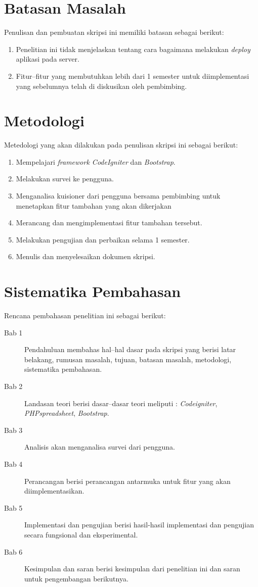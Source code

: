 \section{Batasan Masalah}
\label{sec:batasan}
Penulisan dan pembuatan skripsi ini memiliki batasan sebagai berikut:
\begin{enumerate}
	\item Penelitian ini tidak menjelaskan tentang cara bagaimana melakukan \textit{deploy} aplikasi pada server.
	\item Fitur--fitur yang membutuhkan lebih dari 1 semester untuk diimplementasi yang sebelumnya telah di diskusikan oleh pembimbing.
	
\end{enumerate}


\section{Metodologi}
\label{sec:metlit}
Metedologi yang akan dilakukan pada penulisan skripsi ini sebagai berikut:

\begin{enumerate}
	\item Mempelajari \textit{framework CodeIgniter} dan \textit{Bootstrap}.
	\item Melakukan survei ke pengguna.
	\item Menganalisa kuisioner dari pengguna bersama pembimbing untuk menetapkan fitur tambahan yang akan dikerjakan
	\item Merancang dan mengimplementasi fitur tambahan tersebut.
	\item Melakukan pengujian dan perbaikan selama 1 semester.
	\item Menulis dan menyelesaikan dokumen skripsi.
\end{enumerate}

\section{Sistematika Pembahasan}
\label{sec:sispem}
Rencana pembahasan penelitian ini sebagai berikut:
\begin{description}
	\item[Bab 1] Pendahuluan membahas hal--hal dasar pada skripsi yang berisi latar belakang, rumusan masalah, tujuan, batasan masalah, metodologi, sistematika pembahasan.
	\item[Bab 2] Landasan teori berisi dasar--dasar teori meliputi : \textit{Codeigniter}, \textit{PHPspreadsheet}, \textit{Bootstrap}.
	\item[Bab 3] Analisis akan menganalisa survei dari pengguna.
	\item[Bab 4] Perancangan berisi perancangan antarmuka untuk fitur yang akan diimplementasikan.  
	\item[Bab 5] Implementasi dan pengujian berisi hasil-hasil implementasi dan pengujian secara fungsional dan eksperimental.
	\item[Bab 6] Kesimpulan dan saran berisi kesimpulan dari penelitian ini dan saran untuk pengembangan berikutnya.
\end{description}
